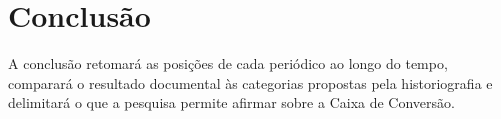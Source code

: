 \chapter{Conclusão}

A conclusão retomará as posições de cada periódico ao longo do tempo, comparará o resultado documental às categorias propostas pela historiografia e delimitará o que a pesquisa permite afirmar sobre a Caixa de Conversão.


